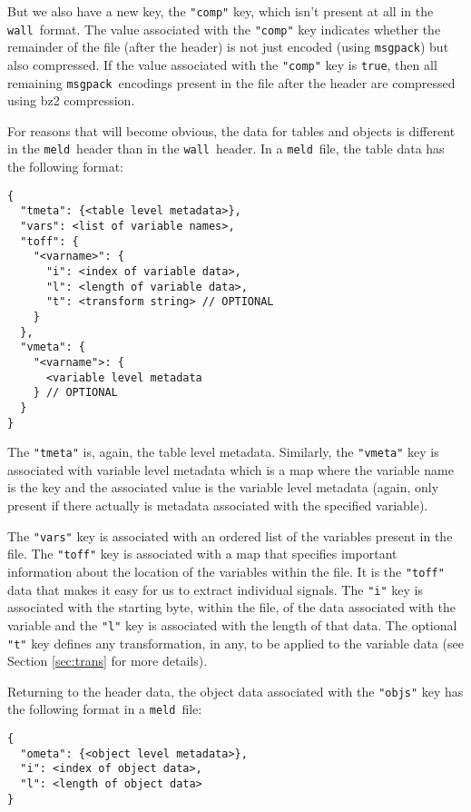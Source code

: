 \documentclass[11pt,a4paper,twocolumn]{article}
\newcommand{\wall}{\texttt{wall}}
\newcommand{\meld}{\texttt{meld}}
\newcommand{\msgpack}{\texttt{msgpack}}
\newcommand{\code}[1]{\texttt{#1}} %
\begin{document}
But we also have a new key, the \code{"comp"} key, which isn't present
at all in the \wall\ format.  The value associated with the
\code{"comp"} key indicates whether the remainder of the file (after
the header) is not just encoded (using \msgpack) but also compressed.  If
the value associated with the \code{"comp"} key is \code{true}, then
all remaining \msgpack\ encodings present in the file after the header
are compressed using bz2\cite{BZ2} compression.

For reasons that will become obvious, the data for tables and objects
is different in the \meld\ header than in the \wall\ header.  In a
\meld\ file, the table data has the following format:

\begin{verbatim}
{
  "tmeta": {<table level metadata>},
  "vars": <list of variable names>,
  "toff": {
    "<varname>": {
      "i": <index of variable data>,
      "l": <length of variable data>,
      "t": <transform string> // OPTIONAL
    }
  },
  "vmeta": {
    "<varname">: {
      <variable level metadata
    } // OPTIONAL
  }
}
\end{verbatim}

The \code{"tmeta"} is, again, the table level metadata.  Similarly,
the \code{"vmeta"} key is associated with variable level metadata
which is a map where the variable name is the key and the associated
value is the variable level metadata (again, only present if there
actually is metadata associated with the specified variable).

The \code{"vars"} key is associated with an ordered list of the
variables present in the file.  The \code{"toff"} key is associated
with a map that specifies important information about the location of
the variables within the file.  It is the \code{"toff"} data that
makes it easy for us to extract individual signals.  The \code{"i"}
key is associated with the starting byte, within the file, of the data
associated with the variable and the \code{"l"} key is associated with
the length of that data.  The optional \code{"t"} key defines any
transformation, in any, to be applied to the variable data (see
Section \ref{sec:trans} for more details).

Returning to the header data, the object data associated with the
\code{"objs"} key has the following format in a \meld\ file:

\begin{verbatim}
{
  "ometa": {<object level metadata>},
  "i": <index of object data>,
  "l": <length of object data>
}
\end{verbatim}
\end{document}
